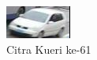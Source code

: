 \begin{figure}[h!]
  \centering
  \includegraphics[scale=1]{gambar/Que61_1120.jpg}
  \caption{Citra Kueri ke-61}
  \label{fig:gambarkueriuntukpengujianketiga}
\end{figure}
